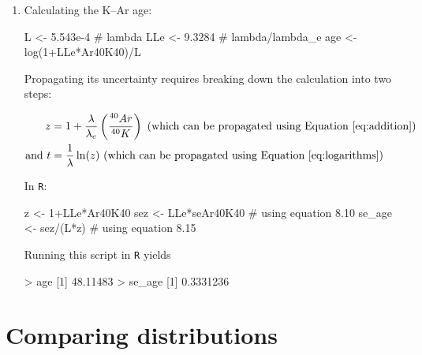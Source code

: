 \begin{enumerate}
\begin{enumerate}
\item Calculating the K--Ar age:

\begin{script}[firstnumber=11]
L <- 5.543e-4 # lambda
LLe <- 9.3284 # lambda/lambda_e
age <- log(1+LLe*Ar40K40)/L
\end{script}

Propagating its uncertainty requires breaking down the calculation
into two steps:

\[
\begin{split}
  z & = 1 + \frac{\lambda}{\lambda_e}\left(\frac{^{40}Ar }{^{40}K}\right)
    \mbox{~(which can be propagated using Equation~\ref{eq:addition})}\\
  \mbox{and~}t & = \frac{1}{\lambda}\ln(z) 
  \mbox{~(which can be propagated using Equation~\ref{eq:logarithms})}
\end{split}
\]

In \texttt{R}:

\begin{script}[firstnumber=14]
z <- 1+LLe*Ar40K40
sez <- LLe*seAr40K40 # using equation 8.10
se_age <- sez/(L*z)  # using equation 8.15
\end{script}

Running this script in \texttt{R} yields

\begin{console}
> age
[1] 48.11483
> se_age
[1] 0.3331236
\end{console}
  
\end{enumerate}

\end{enumerate}
  
\section{Comparing distributions}
\label{sec:sol-comparingdistributions}

